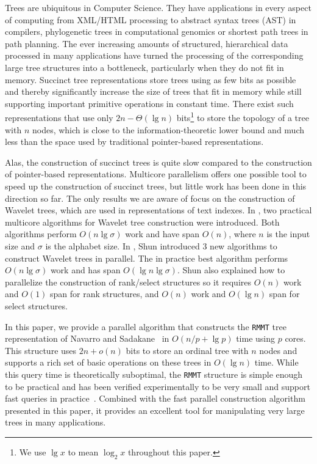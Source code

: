 Trees are ubiquitous in Computer Science.
They have applications in every aspect of computing from XML/HTML
processing to abstract syntax trees (AST) in compilers, phylogenetic trees in
computational genomics or shortest path trees in path planning.
The ever increasing amounts of structured, hierarchical data processed in
many applications have turned the processing of the corresponding large tree
structures into a bottleneck, particularly when they do not fit in memory.
Succinct tree representations store trees using as few bits as possible and
thereby significantly increase the size of trees that fit in memory while
still supporting important primitive operations in constant time.
There exist such representations that use only
$2n - \Theta(\lg n)$ bits\footnote{We use $\lg x$ to mean
  $\log_{2}x$ throughout this paper.} to store the topology of a tree with $n$
nodes, which is close to the information-theoretic lower bound and much less
than the space used by traditional pointer-based representations.

Alas, the construction of succinct trees is quite slow compared to the
construction of pointer-based representations.
Multicore parallelism offers one possible tool to speed up the construction
of succinct trees, but little work has been done in this direction so far.
The only results we are aware of focus on the construction of Wavelet trees,
which are used in representations of text indexes.
In \cite{Fuentes2014}, two practical multicore algorithms
for Wavelet tree construction were introduced.
Both algorithms perform $O(n\lg \sigma)$ work and have span $O(n)$, where $n$
is the input size and $\sigma$ is the alphabet size.
In \cite{DBLP:journals/corr/Shun14}, Shun introduced 3 new algorithms to
construct Wavelet trees in parallel.
The in practice best algorithm performs $O(n\lg \sigma)$ work and has span
$O(\lg n\lg \sigma)$.
Shun also explained how to parallelize the construction of
rank/select structures so it requires $O(n)$ work and $O(1)$ span for rank
structures, and $O(n)$ work and $O(\lg n)$ span for select structures.

In this paper, we provide a parallel algorithm that constructs the {\tt RMMT}
tree representation of Navarro and
Sadakane~\cite{Navarro:2014:FFS:2620785.2601073} in $O(n/p + \lg p)$ time using
$p$ cores.
This structure uses $2n + o(n)$ bits to store an ordinal tree with $n$ nodes
and supports a rich set of basic operations on these trees in $O(\lg n)$ time.
While this query time is theoretically suboptimal, the {\tt RMMT} structure is
simple enough to be practical and has been verified experimentally to be very
small and support fast queries in practice~\cite{ACNSalenex10}.
Combined with the fast parallel construction algorithm presented in this
paper, it provides an excellent tool for manipulating very large trees in
many applications.


